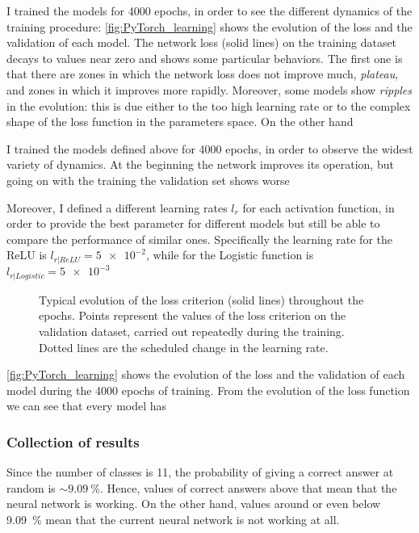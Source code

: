 I trained the models for \num{4000} epochs, in order to see the different dynamics of the training procedure: \autoref{fig:PyTorch_learning} shows the evolution of the loss and the validation of each model.
The network loss (solid lines) on the training dataset decays to values near zero and shows some particular behaviors.
The first one is that there are zones in which the network loss does not improve much, \textit{plateau}, and zones in which it improves more rapidly.
Moreover, some models show \textit{ripples} in the evolution: this is due either to the too high learning rate or to the complex shape of the loss function in the parameters space.
On the other hand

I trained the models defined above for \num{4000} epochs, in order to observe the widest variety of dynamics.
At the beginning the network improves its operation, but going on with the training the validation set shows worse

Moreover, I defined a different learning rates $l_r$ for each activation function, in order to provide the best parameter for different models but still be able to compare the performance of similar ones.
Specifically the learning rate for the \acs{ReLU} is $l_{r|ReLU} = \num{5e-2}$, while for the Logistic function is $l_{r|Logistic}= \num{5e-3}$

\begin{figure}[htbp]
	\centering
	
	\caption{Typical evolution of the loss criterion (solid lines) throughout the epochs.
		Points represent the values of the loss criterion on the validation dataset, carried out repeatedly during the training.
		Dotted lines are the scheduled change in the learning rate.
	}
	\label{fig:PyTorch_learning}
\end{figure}

\autoref{fig:PyTorch_learning} shows the evolution of the loss and the validation of each model during the \num{4000} epochs of training.
From the evolution of the loss function we can see that every model has 

\subsubsection{Collection of results}
Since the number of classes is \num{11}, the probability of giving a correct answer at random is $\sim \SI{9.09}{\percent}$.
Hence, values of correct answers above that mean that the neural network is working.
On the other hand, values around or even below \SI{9.09}{\percent} mean that the current neural network is not working at all.

